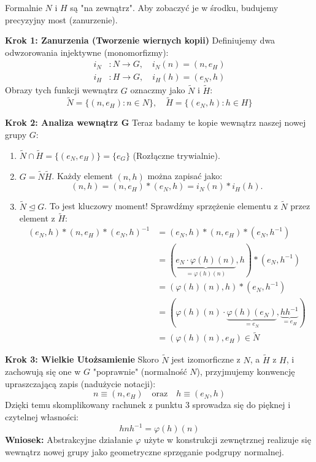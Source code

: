 \begin{proposition}
Formalnie $N$ i $H$ są "na zewnątrz". Aby zobaczyć je w środku, budujemy precyzyjny most (zanurzenie).

\textbf{Krok 1: Zanurzenia (Tworzenie wiernych kopii)}
Definiujemy dwa odwzorowania injektywne (monomorfizmy):
\begin{align*}
    i_N &: N \to G, \quad i_N(n) = (n, e_H) \\
    i_H &: H \to G, \quad i_H(h) = (e_N, h)
\end{align*}
Obrazy tych funkcji wewnątrz $G$ oznaczmy jako $\tilde{N}$ i $\tilde{H}$:
\[ \tilde{N} = \{(n, e_H) : n \in N\}, \quad \tilde{H} = \{(e_N, h) : h \in H\} \]

\textbf{Krok 2: Analiza wewnątrz G}
Teraz badamy te kopie wewnątrz naszej nowej grupy $G$:
\begin{enumerate}
    \item $\tilde{N} \cap \tilde{H} = \{(e_N, e_H)\} = \{e_G\}$ (Rozłączne trywialnie).
    \item $G = \tilde{N}\tilde{H}$. Każdy element $(n,h)$ można zapisać jako:
    \[ (n,h) = (n, e_H) * (e_N, h) = i_N(n) * i_H(h). \]
    \item $\tilde{N} \unlhd G$. To jest kluczowy moment! Sprawdźmy sprzężenie elementu z $\tilde{N}$ przez element z $\tilde{H}$:
    \begin{align*}
        (e_N, h) * (n, e_H) * (e_N, h)^{-1} &= (e_N, h) * (n, e_H) * (e_N, h^{-1}) \\
        &= (\underbrace{e_N \cdot \varphi(h)(n)}_{=\varphi(h)(n)}, h) * (e_N, h^{-1}) \\
        &= (\varphi(h)(n), h) * (e_N, h^{-1}) \\
        &= (\varphi(h)(n) \cdot \underbrace{\varphi(h)(e_N)}_{=e_N}, \underbrace{h h^{-1}}_{=e_H}) \\
        &= (\varphi(h)(n), e_H) \in \tilde{N}
    \end{align*}
\end{enumerate}

\textbf{Krok 3: Wielkie Utożsamienie}
Skoro $\tilde{N}$ jest izomorficzne z $N$, a $\tilde{H}$ z $H$, i zachowują się one w $G$ "poprawnie" (normalność $N$), przyjmujemy konwencję upraszczającą zapis (nadużycie notacji):
\[ n \equiv (n, e_H) \quad \text{oraz} \quad h \equiv (e_N, h) \]
Dzięki temu skomplikowany rachunek z punktu 3 sprowadza się do pięknej i czytelnej własności:
\[ h n h^{-1} = \varphi(h)(n) \]
\textbf{Wniosek:} Abstrakcyjne działanie $\varphi$ użyte w konstrukcji zewnętrznej realizuje się wewnątrz nowej grupy jako geometryczne sprzęganie podgrupy normalnej.
\end{proposition}

